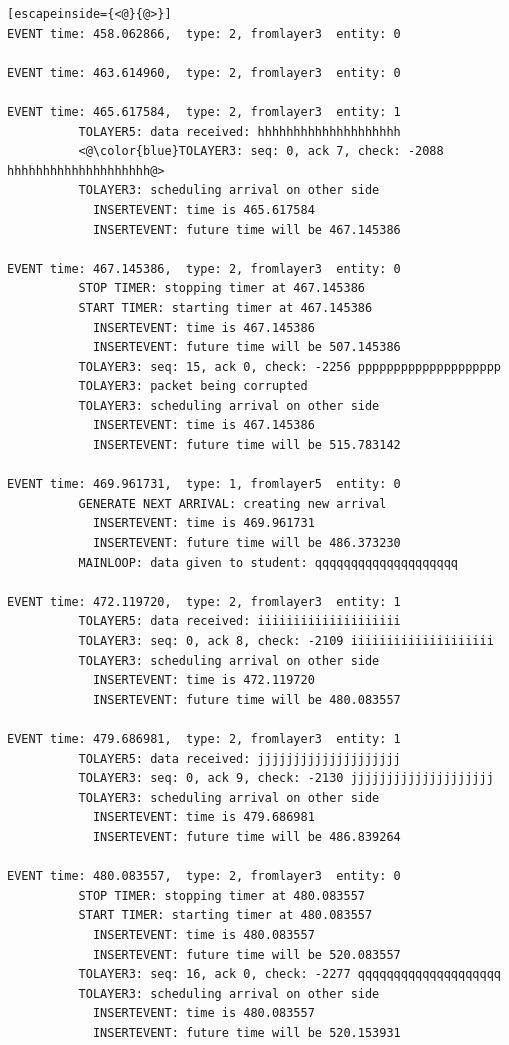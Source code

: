 \documentclass[paper=a4, fontsize=11pt]{scrartcl}
\numberwithin{equation}{section}		%
\numberwithin{figure}{section}			%
\numberwithin{table}{section}				%
\begin{document}
\begin{lstlisting}[escapeinside={<@}{@>}]
EVENT time: 458.062866,  type: 2, fromlayer3  entity: 0

EVENT time: 463.614960,  type: 2, fromlayer3  entity: 0

EVENT time: 465.617584,  type: 2, fromlayer3  entity: 1
          TOLAYER5: data received: hhhhhhhhhhhhhhhhhhhh
          <@\color{blue}TOLAYER3: seq: 0, ack 7, check: -2088 hhhhhhhhhhhhhhhhhhhh@>
          TOLAYER3: scheduling arrival on other side
            INSERTEVENT: time is 465.617584
            INSERTEVENT: future time will be 467.145386

EVENT time: 467.145386,  type: 2, fromlayer3  entity: 0
          STOP TIMER: stopping timer at 467.145386
          START TIMER: starting timer at 467.145386
            INSERTEVENT: time is 467.145386
            INSERTEVENT: future time will be 507.145386
          TOLAYER3: seq: 15, ack 0, check: -2256 pppppppppppppppppppp
          TOLAYER3: packet being corrupted
          TOLAYER3: scheduling arrival on other side
            INSERTEVENT: time is 467.145386
            INSERTEVENT: future time will be 515.783142

EVENT time: 469.961731,  type: 1, fromlayer5  entity: 0
          GENERATE NEXT ARRIVAL: creating new arrival
            INSERTEVENT: time is 469.961731
            INSERTEVENT: future time will be 486.373230
          MAINLOOP: data given to student: qqqqqqqqqqqqqqqqqqqq

EVENT time: 472.119720,  type: 2, fromlayer3  entity: 1
          TOLAYER5: data received: iiiiiiiiiiiiiiiiiiii
          TOLAYER3: seq: 0, ack 8, check: -2109 iiiiiiiiiiiiiiiiiiii
          TOLAYER3: scheduling arrival on other side
            INSERTEVENT: time is 472.119720
            INSERTEVENT: future time will be 480.083557

EVENT time: 479.686981,  type: 2, fromlayer3  entity: 1
          TOLAYER5: data received: jjjjjjjjjjjjjjjjjjjj
          TOLAYER3: seq: 0, ack 9, check: -2130 jjjjjjjjjjjjjjjjjjjj
          TOLAYER3: scheduling arrival on other side
            INSERTEVENT: time is 479.686981
            INSERTEVENT: future time will be 486.839264

EVENT time: 480.083557,  type: 2, fromlayer3  entity: 0
          STOP TIMER: stopping timer at 480.083557
          START TIMER: starting timer at 480.083557
            INSERTEVENT: time is 480.083557
            INSERTEVENT: future time will be 520.083557
          TOLAYER3: seq: 16, ack 0, check: -2277 qqqqqqqqqqqqqqqqqqqq
          TOLAYER3: scheduling arrival on other side
            INSERTEVENT: time is 480.083557
            INSERTEVENT: future time will be 520.153931


\end{lstlisting}
\end{document}
